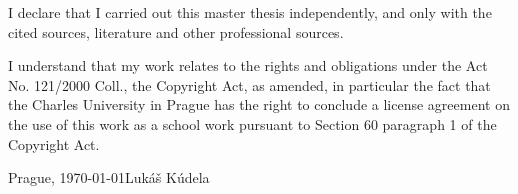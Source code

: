 
\vspace*{\fill}

\noindent
I declare that I carried out this master thesis independently, and only with the cited sources, literature and other professional sources.

\medskip

\noindent
I understand that my work relates to the rights and obligations under the Act No. 121/2000 Coll., the Copyright Act, as amended, in particular the fact that the Charles University in Prague has the right to conclude a license agreement on the use of this work as a school work pursuant to Section 60 paragraph 1 of the Copyright Act.

\bigskip

\noindent
Prague, \today \hspace{\fill}Lukáš Kúdela